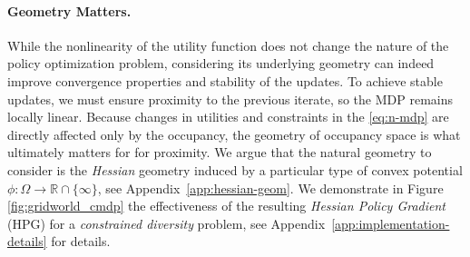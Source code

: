 \documentclass{article}
\theoremstyle{plain}
\theoremstyle{definition}
\theoremstyle{remark}
\begin{document}
\paragraph{Geometry Matters.} 
While the nonlinearity of the utility function does not change the nature of the policy optimization problem, considering its underlying geometry can indeed improve convergence properties and stability of the updates. 
To achieve stable updates, we must ensure proximity to the previous iterate, so the MDP remains locally linear. 
Because changes in utilities and constraints in the \ref{eq:n-mdp} are directly affected only by the occupancy,
the geometry of occupancy space is what ultimately matters for for proximity.
We argue that the natural geometry to consider is the \emph{Hessian} geometry induced by a particular type of convex potential $\phi: \Omega \to \mathbb{R}\cap\{\infty\}$, see Appendix~\ref{app:hessian-geom}.
We demonstrate in Figure \ref{fig:gridworld_cmdp} the effectiveness of the resulting \emph{Hessian Policy Gradient} (HPG) for a \emph{constrained diversity} problem, see Appendix~\ref{app:implementation-details} for details.

\end{document}
